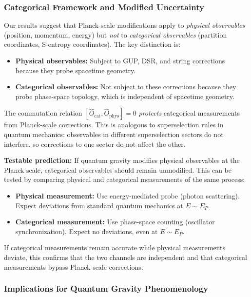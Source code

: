 \documentclass[twocolumn,10pt]{article}
\theoremstyle{remark}
\begin{document}
\subsubsection{Categorical Framework and Modified Uncertainty}

Our results suggest that Planck-scale modifications apply to \textit{physical observables} (position, momentum, energy) but \textit{not} to \textit{categorical observables} (partition coordinates, S-entropy coordinates). The key distinction is:

\begin{itemize}
    \item \textbf{Physical observables:} Subject to GUP, DSR, and string corrections because they probe spacetime geometry.
    
    \item \textbf{Categorical observables:} Not subject to these corrections because they probe phase-space topology, which is independent of spacetime geometry.
\end{itemize}

The commutation relation $[\hat{O}_{\text{cat}}, \hat{O}_{\text{phys}}] = 0$ \textit{protects} categorical measurements from Planck-scale corrections. This is analogous to superselection rules in quantum mechanics: observables in different superselection sectors do not interfere, so corrections to one sector do not affect the other.

\textbf{Testable prediction:} If quantum gravity modifies physical observables at the Planck scale, categorical observables should remain unmodified. This can be tested by comparing physical and categorical measurements of the same process:
\begin{itemize}
    \item \textbf{Physical measurement:} Use energy-mediated probe (photon scattering). Expect deviations from standard quantum mechanics at $E \sim E_P$.
    
    \item \textbf{Categorical measurement:} Use phase-space counting (oscillator synchronization). Expect no deviations, even at $E \sim E_P$.
\end{itemize}

If categorical measurements remain accurate while physical measurements deviate, this confirms that the two channels are independent and that categorical measurements bypass Planck-scale corrections.

\subsubsection{Implications for Quantum Gravity Phenomenology}
\end{document}
